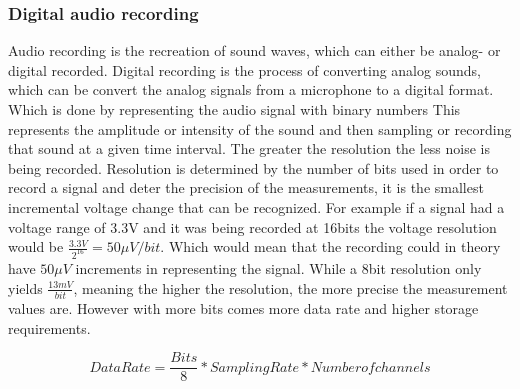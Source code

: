 \subsubsection{Digital audio recording}\label{sec:DigitalAudiRec}



Audio recording is the recreation of sound waves, which can either be analog- or digital recorded.
Digital recording is the process of converting analog sounds, which can be convert the analog signals from a microphone to a digital format. 
Which is done by representing the audio signal with binary numbers 
This represents the amplitude or intensity of the sound and then sampling or recording that sound at a given time interval.
The greater the resolution the less noise is being recorded.
Resolution is determined by the number of bits used in order to record a signal and deter the precision of the measurements, it is the smallest incremental voltage change that can be recognized.
For example if a signal had a voltage range of 3.3V and it was being recorded at 16bits the voltage resolution would be $\frac{3.3V}{2^{16}} = 50\mu V/bit$.
Which would mean that the recording could in theory have $50\mu V$ increments in representing the signal.  
While a 8bit resolution only yields $\frac{13mV}{bit}$, meaning the higher the resolution, the more precise the measurement values are.
However with more bits comes more data rate and higher storage requirements.

\begin{equation}
    Data Rate = \frac{Bits}{8} * Sampling Rate * Number of channels 
    \label{eq:dataRate}
\end{equation}

